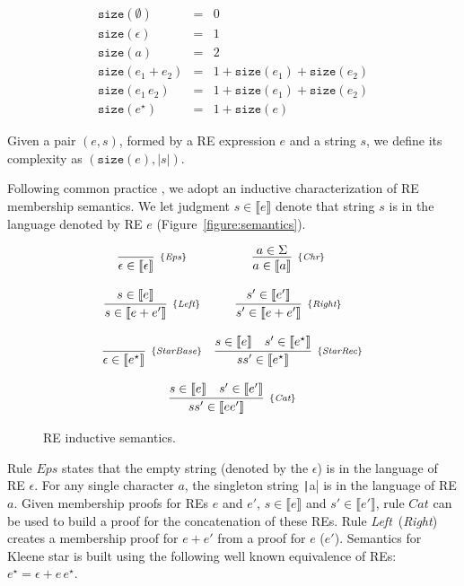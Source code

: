 \documentclass[review]{elsarticle}
\newcommand{\Eps}{\textit{Eps}}
\newcommand{\Chr}{\textit{Chr}}
\newcommand{\Catt}{\textit{Cat}}
\newcommand{\Left}{\textit{Left}}
\newcommand{\Right}{\textit{Right}}
\newcommand{\StarBase}{\textit{StarBase}}
\newcommand{\StarRec}{\textit{StarRec}}
\newcommand{\sembrackets}[1]{\ensuremath{\llbracket #1 \rrbracket}}
\newcommand{\size}{\ensuremath{\texttt{size}}}
\newcommand{\coq}[1]{\texttt|#1|}
\theoremstyle{definition}
\begin{document}
\[
\begin{array}{lcl}
   \size(\emptyset) & = & 0 \\
   \size(\epsilon)  & = & 1 \\
   \size(a)         & = & 2 \\
   \size(e_1 + e_2) & = & 1 + \size(e_1) + \size(e_2)\\
   \size(e_1\,e_2)  & = & 1 + \size(e_1) + \size(e_2)\\
   \size(e ^\star)  & = & 1 + \size(e)
\end{array}
\]

Given a pair $(e,s)$, formed by a RE expression $e$ and a string $s$, we define its complexity as
$(\size(e),|s|)$. 

Following common practice \cite{Lopes2016,Ribeiro2017,Rathnayake2011}, we adopt an inductive
characterization of RE membership semantics. We let judgment $s \in \sembrackets{e}$ denote
that string $s$ is in the language denoted by RE $e$ (Figure~\ref{figure:semantics}).

\begin{figure}[h]
	\[
	\begin{array}{cc}
	\infer[_{\{\Eps\}}]
	{\epsilon \in \sembrackets{\epsilon}}{} &
	\infer[_{\{\Chr\}}]
	{a \in \sembrackets{a}}{a \in \Sigma} \\ \\
	\infer[_{\{\Left\}}]
	{s \in \sembrackets{e + e'}}{s \in \sembrackets{e}} &
	\infer[_{\{\Right\}}]
	{s' \in \sembrackets{e + e'}}{s' \in \sembrackets{e'}} \\ \\
	\infer[_{\{\StarBase\}}]
	{\epsilon \in \sembrackets{e^\star}}{} &
	\infer[_{\{\StarRec\}}]
	{ss' \in \sembrackets{e^\star}}
	{s \in \sembrackets{e} & s' \in \sembrackets{e^\star}} \\ \\
	\multicolumn{2}{c}{
		\infer[_{\{\Catt\}}]
		{ss' \in \sembrackets{ee'}}
		{s \in \sembrackets{e} & s' \in \sembrackets{e'}}
	} \\
	\end{array}
	\]
	\centering
	\caption{RE inductive semantics.}
	\label{figure:resemantics}
\end{figure}

Rule $\Eps$ states that the empty string (denoted by the $\epsilon$)
is in the language of RE $\epsilon$. For any single character $a$, the singleton
string \coq{a} is in the language 
of RE $a$. Given membership proofs for REs $e$ and $e'$, $s \in \sembrackets{e}$ 
and $s' \in\sembrackets{e'}$, rule $\Catt$ can be used to build a proof
for the concatenation of these REs.  Rule \Left~(\Right) creates a membership proof
for $e + e'$ from a proof for $e$ ($e'$). Semantics for Kleene star
is built using the following well known equivalence of REs: $e^\star
= \epsilon + e\,e^\star$. 
\end{document}
